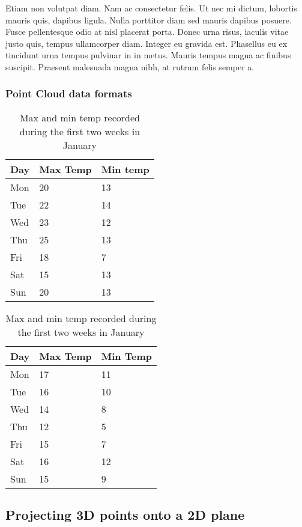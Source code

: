 Etiam non volutpat diam. Nam ac consectetur felis. Ut nec mi dictum, lobortis mauris quis, dapibus ligula. Nulla porttitor diam sed mauris dapibus posuere. Fusce pellentesque odio at nisl placerat porta. Donec urna risus, iaculis vitae justo quis, tempus ullamcorper diam. Integer eu gravida est. Phasellus eu ex tincidunt urna tempus pulvinar in in metus. Mauris tempus magna ac finibus suscipit. Praesent malesuada magna nibh, at rutrum felis semper a.

\subsubsection{Point Cloud data formats}

\begin{table}[h]
	\centering
	\begin{subtable}[h]{0.45\textwidth}
		\centering
		\begin{tabular}{l | l | l}
			Day & Max Temp & Min temp \\
			\hline \hline
			Mon & 20 & 13 \\
			Tue & 22 & 14 \\
			Wed & 23 & 12 \\
			Thu & 25 & 13 \\
			Fri & 18 & 7 \\
			Sat & 15 & 13 \\
			Sun & 20 & 13
		\end{tabular}
		\caption{First Week}
		\label{tab:week1}
	\end{subtable}
	\hfill
	\begin{subtable}[h]{0.45\textwidth}
		\centering
		\begin{tabular}{l | l | l}
			Day & Max Temp & Min Temp \\
			\hline \hline
			Mon & 17 & 11 \\
			Tue & 16 & 10 \\
			Wed & 14 & 8 \\
			Thu & 12 & 5 \\
			Fri & 15 & 7 \\
			Sat & 16 & 12 \\
			Sun & 15 & 9
		\end{tabular}
		\caption{Second Week}
		\label{tab:week2}
	\end{subtable}
	\caption{Max and min temp recorded during the first two weeks in January}
	\label{tab:temps}
\end{table}


\subsection{Projecting 3D points onto a 2D plane}


